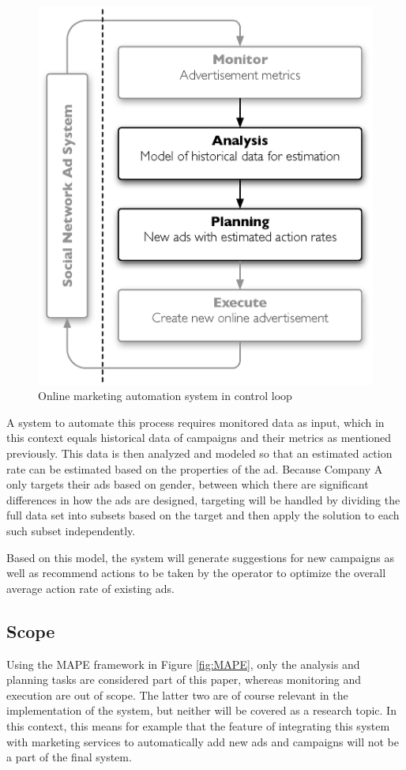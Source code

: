 \documentclass{sig-alternate}
\begin{document}
\begin{figure}[htb] \centering \includegraphics[width=\columnwidth]{mape-marketing.eps}
	\caption{Online marketing automation system in control loop}
	\label{fig:MAPEMarketing}
\end{figure}

A system to automate this process requires monitored data as input, which in this context equals historical data of campaigns and their metrics as mentioned previously. This data is then analyzed and modeled so that an estimated action rate can be estimated based on the properties of the ad. Because Company A only targets their ads based on gender, between which there are significant differences in how the ads are designed, targeting will be handled by dividing the full data set into subsets based on the target and then apply the solution to each such subset independently.

Based on this model, the system will generate suggestions for new campaigns as well as recommend actions to be taken by the operator to optimize the overall average action rate of existing ads.

\subsection{Scope}
Using the MAPE framework in Figure \ref{fig:MAPE}, only the analysis and planning tasks are considered part of this paper, whereas monitoring and execution are out of scope. The latter two are of course relevant in the implementation of the system, but neither will be covered as a research topic. In this context, this means for example that the feature of integrating this system with marketing services to automatically add new ads and campaigns will not be a part of the final system.
\end{document}
